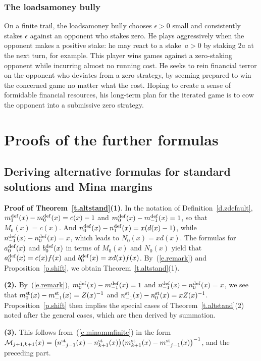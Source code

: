 \documentclass[letterpaper,11pt,oneside,reqno]{amsbook}
\newcommand{\e}[0]{\epsilon}
\numberwithin{figure}{chapter}
\theoremstyle{definition}
\theoremstyle{definition}
\theoremstyle{definition}
\theoremstyle{definition}
\theoremstyle{definition}
\newcommand{\adef}{a^{\rm def}}
\newcommand{\bdef}{b^{\rm def}}
\newcommand{\mdef}{m^{\rm def}}
\newcommand{\ndef}{n^{\rm def}}
\newcommand{\mst}{m^{\rm st}}
\newcommand{\nst}{n^{\rm st}}
\newcommand{\minamm}{\mathcal{M}}
\begin{document}
\subsection{The loadsamoney bully}

On a finite trail, the loadsamoney bully chooses $\e > 0$ small and consistently stakes $\e$ against an opponent who stakes zero. He plays aggressively when the opponent makes a positive stake: he may react to a stake~$a > 0$ by staking $2a$ at the next turn, for example. This player wins games against a zero-staking opponent while incurring almost no running cost. He seeks to rein financial terror on the opponent who deviates from a zero strategy, by seeming prepared to win the concerned game no matter what the cost. Hoping to create a sense of formidable financial resources, his long-term plan for the iterated game is to cow the opponent into a submissive zero strategy.


 
 \appendix
 
\chapter{Proofs of the further formulas}\label{s.furtherformulas}


\section{Deriving  alternative formulas for standard solutions and  Mina margins}


{\bf Proof of Theorem~\ref{t.altstand}(1)}. In the notation of Definition~\ref{d.zdefault},
$\mdef_1(x) - \mdef_0(x) = c(x) -1$ and $\mdef_0(x) - \mdef_{-1}(x) = 1$, so that $M_0(x) = c(x)$. And $\ndef_0(x) - \ndef_1(x) = x(d(x) -1)$, while $\ndef_{-1}(x) - \ndef_0(x) = x$, which leads to   $N_0(x) = xd(x)$.  The formulas for $\adef_0(x)$ and $\bdef_0(x)$ in terms of $M_0(x)$ and $N_0(x)$ yield that
$\adef_0(x) = c(x)f(x)$ and $\bdef_0(x) = xd(x)f(x)$. By~(\ref{e.remark}) and Proposition~\ref{p.shift}, we obtain Theorem~\ref{t.altstand}(1). 

{\bf (2).} By~(\ref{e.remark}), $\mdef_0(x) - \mdef_{-1}(x) = 1$ and $\ndef_{-1}(x) - \ndef_0(x) = x$, we see that 
$\mst_0(x) - \mst_{-1}(x) = Z(x)^{-1}$ and $\nst_{-1}(x) - \nst_0(x) = x Z(x)^{-1}$. Proposition~\ref{p.shift} then implies 
the special cases of
Theorem~\ref{t.altstand}(2) noted after the general cases, which are then derived by summation. 

{\bf (3).}  This follows from~(\ref{e.minammfinite}) in the form
 $\minamm_{j+1,k+1}(x) = \big( \nst_{-j-1} (x) - \nst_{k+1} (x) \big) \big( \mst_{k+1}(x) - \mst_{-j-1}(x) \big)^{-1}$, and the preceding part.
\end{document}
